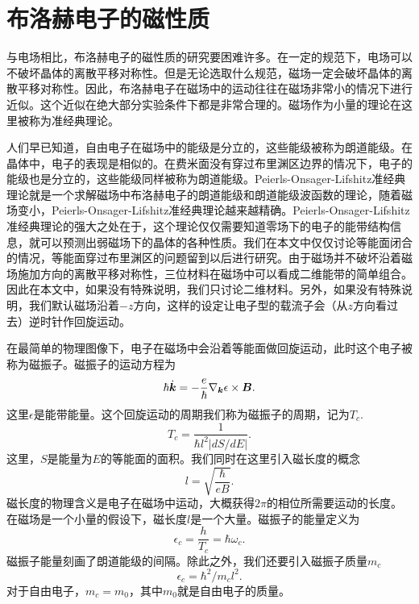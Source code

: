 \section{布洛赫电子的磁性质}

与电场相比，布洛赫电子的磁性质的研究要困难许多。在一定的规范下，电场可以不破坏晶体的离散平移对称性。但是无论选取什么规范，磁场一定会破坏晶体的离散平移对称性。因此，布洛赫电子在磁场中的运动往往在磁场非常小的情况下进行近似。这个近似在绝大部分实验条件下都是非常合理的。磁场作为小量的理论在这里被称为准经典理论。


人们早已知道，自由电子在磁场中的能级是分立的，这些能级被称为朗道能级。在晶体中，电子的表现是相似的。在费米面没有穿过布里渊区边界的情况下，电子的能级也是分立的，这些能级同样被称为朗道能级。Peierls-Onsager-Lifshitz准经典理论就是一个求解磁场中布洛赫电子的朗道能级和朗道能级波函数的理论，随着磁场变小，Peierls-Onsager-Lifshitz准经典理论越来越精确。Peierls-Onsager-Lifshitz准经典理论的强大之处在于，这个理论仅仅需要知道零场下的电子的能带结构信息，就可以预测出弱磁场下的晶体的各种性质。我们在本文中仅仅讨论等能面闭合的情况，等能面穿过布里渊区的问题留到以后进行研究。由于磁场并不破坏沿着磁场施加方向的离散平移对称性，三位材料在磁场中可以看成二维能带的简单组合。因此在本文中，如果没有特殊说明，我们只讨论二维材料。另外，如果没有特殊说明，我们默认磁场沿着$-z$方向，这样的设定让电子型的载流子会（从$z$方向看过去）逆时针作回旋运动。

在最简单的物理图像下，电子在磁场中会沿着等能面做回旋运动，此时这个电子被称为磁振子。磁振子的运动方程为
\begin{equation}
\hbar\dot{\boldsymbol{k}}=-\frac{e}{\hbar}\nabla_{\boldsymbol{k}}\epsilon\times\boldsymbol{B}.
\end{equation}
这里$\epsilon$是能带能量。这个回旋运动的周期我们称为磁振子的周期，记为$T_c$.
\begin{equation}
T_c=\frac{1}{\hbar l^2 |dS/dE|}.
\end{equation}
这里，$S$是能量为$E$的等能面的面积。我们同时在这里引入磁长度的概念
\begin{equation}
l=\sqrt{\frac{\hbar}{eB}}.
\end{equation}
磁长度的物理含义是电子在磁场中运动，大概获得$2\pi$的相位所需要运动的长度。在磁场是一个小量的假设下，磁长度$l$是一个大量。磁振子的能量定义为
\begin{equation}
\epsilon_c=\frac{h}{T_c}=\hbar \omega_c.
\end{equation}
磁振子能量刻画了朗道能级的间隔。除此之外，我们还要引入磁振子质量$m_c$
\begin{equation}
\epsilon_c = \hbar^2/m_c l^2.
\end{equation}
对于自由电子，$m_c=m_0$，其中$m_0$就是自由电子的质量。


